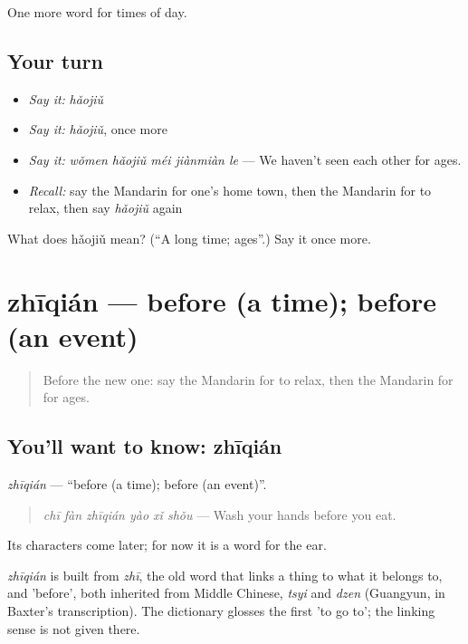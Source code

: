 \begin{grammarlens}[title={What you've built}]
One more word for times of day.
\end{grammarlens}

\subsection*{Your turn}
\begin{itemize}
\raggedright
  \item \emph{Say it:} \emph{hǎojiǔ}
  \item \emph{Say it:} \emph{hǎojiǔ}, once more
  \item \emph{Say it:} \emph{wǒmen hǎojiǔ méi jiànmiàn le} — We haven't seen each other for ages.
  \item \emph{Recall:} say the Mandarin for one's home town, then the Mandarin for to relax, then say \emph{hǎojiǔ} again
\end{itemize}

\begin{tcolorbox}[breakable,colback=teal!4,colframe=teal!35!black,title={Before you move on}]
What does hǎojiǔ mean? (\textquotedblleft{}A long time; ages\textquotedblright{}.) Say it once more.
\end{tcolorbox}
\section[zhīqián]{zhīqián — before (a time); before (an event)}

\label{lesson:ZH-C185-zhiqian}



\begin{quote}
Before the new one: say the Mandarin for to relax, then the Mandarin for for ages.
\end{quote}

\subsection*{You'll want to know: zhīqián}
\emph{zhīqián} — \textquotedblleft{}before (a time); before (an event)\textquotedblright{}.

\begin{quote}
\emph{chī fàn zhīqián yào xǐ shǒu} — Wash your hands before you eat.
\end{quote}

Its characters come later; for now it is a word for the ear.

\begin{cousinweb}
\emph{zhīqián} is built from \emph{zhī}, the old word that links a thing to what it belongs to, and  'before', both inherited from Middle Chinese, \emph{tsyi} and \emph{dzen} (Guangyun, in Baxter's transcription). The dictionary glosses the first 'to go to'; the linking sense is not given there.
\end{cousinweb}

